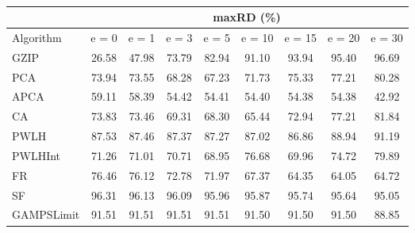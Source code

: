 \begin{table}[h]
\newcommand{\cpca}{\cellcolor{cyan!20}}
\newcommand{\capca}{\cellcolor{green!20}}
\newcommand{\cfr}{\cellcolor{yellow!25}}
\newcommand{\cgzip}{\cellcolor{orange!20}}
\newcommand{\best}{\cellcolor{gray!30}}
\centering\hspace*{0cm}\begin{tabular}{| l | c | c | c | c | c | c | c | c |}\cline{2-9}\multicolumn{1}{c|}{}& \multicolumn{8}{c|}{maxRD (\%)}\\\hline
{Algorithm} & {e = 0} & {e = 1} & {e = 3} & {e = 5} & {e = 10} & {e = 15} & {e = 20} & {e = 30} \\\hline
{GZIP\cgzip} & {\best26.58} & {\best47.98} & {73.79} & {82.94} & {91.10} & {93.94} & {95.40} & {96.69} \\\hline
{PCA\cpca} & {73.94} & {73.55} & {68.28} & {67.23} & {71.73} & {75.33} & {77.21} & {80.28} \\\hline
{APCA\capca} & {59.11} & {58.39} & {\best54.42} & {\best54.41} & {\best54.40} & {\best54.38} & {\best54.38} & {\best42.92} \\\hline
{CA} & {73.83} & {73.46} & {69.31} & {68.30} & {65.44} & {72.94} & {77.21} & {81.84} \\\hline
{PWLH} & {87.53} & {87.46} & {87.37} & {87.27} & {87.02} & {86.86} & {88.94} & {91.19} \\\hline
{PWLHInt} & {71.26} & {71.01} & {70.71} & {68.95} & {76.68} & {69.96} & {74.72} & {79.89} \\\hline
{FR\cfr} & {76.46} & {76.12} & {72.78} & {71.97} & {67.37} & {64.35} & {64.05} & {64.72} \\\hline
{SF} & {96.31} & {96.13} & {96.09} & {95.96} & {95.87} & {95.74} & {95.64} & {95.05} \\\hline
{GAMPSLimit} & {91.51} & {91.51} & {91.51} & {91.51} & {91.50} & {91.50} & {91.50} & {88.85} \\\hline
\end{tabular}
\caption{\captionminmax}
\label{experiments:minmax}
\end{table}
